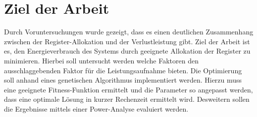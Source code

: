 \section{Ziel der Arbeit}
\label{sec:ziele}
Durch Voruntersuchungen wurde gezeigt, dass es einen deutlichen Zusammenhang zwischen der Register-Allokation und der Verlustleistung gibt. Ziel der Arbeit ist es, den Energieverbrauch des Systems durch geeignete Allokation der Register zu minimieren. Hierbei soll untersucht werden welche Faktoren den ausschlaggebenden Faktor für die Leistungsaufnahme bieten. Die Optimierung soll anhand eines genetischen Algorithmus implementiert werden. Hierzu muss eine geeignete Fitness-Funktion ermittelt und die Parameter so angepasst werden, dass eine optimale Lösung in kurzer Rechenzeit ermittelt wird. Desweitern sollen die Ergebnisse mittels einer Power-Analyse evaluiert werden.

%
